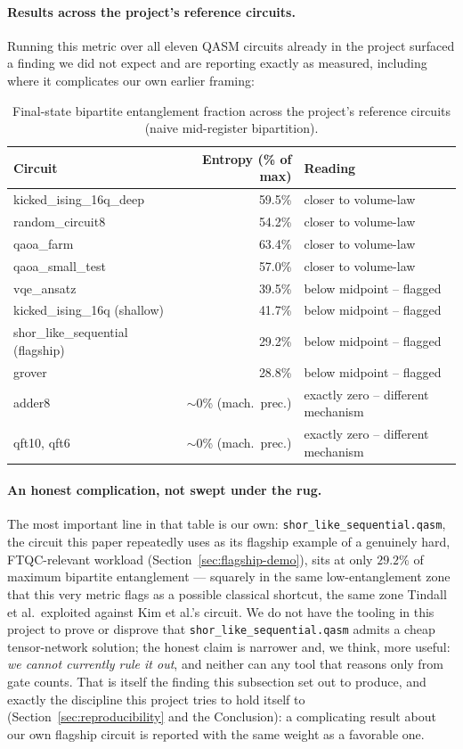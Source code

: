 \documentclass[9pt,twocolumn]{extarticle}
\begin{document}
\paragraph{Results across the project's reference circuits.} Running this
metric over all eleven QASM circuits already in the project surfaced a
finding we did not expect and are reporting exactly as measured, including
where it complicates our own earlier framing:

\begin{table}[t]
\centering\footnotesize
\begin{tabular}{lrl}
\toprule
Circuit & Entropy (\% of max) & Reading \\
\midrule
kicked\_ising\_16q\_deep & 59.5\% & closer to volume-law \\
random\_circuit8 & 54.2\% & closer to volume-law \\
qaoa\_farm & 63.4\% & closer to volume-law \\
qaoa\_small\_test & 57.0\% & closer to volume-law \\
vqe\_ansatz & 39.5\% & below midpoint -- flagged \\
kicked\_ising\_16q (shallow) & 41.7\% & below midpoint -- flagged \\
shor\_like\_sequential (flagship) & 29.2\% & below midpoint -- flagged \\
grover & 28.8\% & below midpoint -- flagged \\
adder8 & $\sim$0\% (mach.\ prec.) & exactly zero -- different mechanism \\
qft10, qft6 & $\sim$0\% (mach.\ prec.) & exactly zero -- different mechanism \\
\bottomrule
\end{tabular}
\caption{Final-state bipartite entanglement fraction across the project's
reference circuits (naive mid-register bipartition).}
\label{tab:entanglement-fraction}
\end{table}

\paragraph{An honest complication, not swept under the rug.} The most
important line in that table is our own: \texttt{shor\_like\_sequential.qasm},
the circuit this paper repeatedly uses as its flagship example of a
genuinely hard, FTQC-relevant workload (Section~\ref{sec:flagship-demo}),
sits at only $29.2\%$ of maximum bipartite entanglement --- squarely in the
same low-entanglement zone that this very metric flags as a possible
classical shortcut, the same zone Tindall et al.\ exploited against Kim et
al.'s circuit. We do not have the tooling in this project to prove or
disprove that \texttt{shor\_like\_sequential.qasm} admits a cheap
tensor-network solution; the honest claim is narrower and, we think, more
useful: \emph{we cannot currently rule it out}, and neither can any
tool that reasons only from gate counts. That is itself the finding this
subsection set out to produce, and exactly the discipline this project
tries to hold itself to (Section~\ref{sec:reproducibility} and the
Conclusion): a complicating result about our own flagship circuit is
reported with the same weight as a favorable one.
\end{document}
